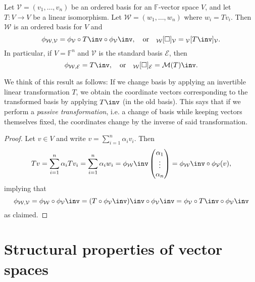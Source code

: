 \documentclass[a4paper, 11pt]{memoir}
\theoremstyle{plaincustomnumber}
\theoremstyle{changedotbreakcustomnumber}
\newcommand{\calV}{\mathcal{V}}
\newcommand{\calW}{\mathcal{W}}
\newcommand{\calE}{\mathcal{E}}
\newcommand{\field}{\mathbb{F}}
\begin{document}
\begin{proposition}
    Let $\calV = (v_1, \ldots, v_n)$ be an ordered basis for an $\field$-vector space $V$, and let $T \colon V \to V$ be a linear isomorphism. Let $\calW = (w_1, \ldots, w_n)$ where $w_i = Tv_i$. Then $\calW$ is an ordered basis for $V$ and
    \begin{equation*}
        \basischange{\calW}{\calV}
            = \coordmap{\calV} \circ T\inv \circ \coordmap{\calV}\inv,
        \quad \text{or} \quad
        \basischangemat{\calW}{\calV}
            = \mr{\calV}{T\inv}{\calV}.
    \end{equation*}
    In particular, if $V = \field^n$ and $\calV$ is the standard basis $\calE$, then
    \begin{equation*}
        \basischange{\calW}{\calE}
            = T\inv,
        \quad \text{or} \quad
        \basischangemat{\calW}{\calE}
            = \smr{T}\inv.
    \end{equation*}
\end{proposition}
%
We think of this result as follows: If we change basis by applying an invertible linear transformation $T$, we obtain the coordinate vectors corresponding to the transformed basis by applying $T\inv$ (in the old basis). This says that if we perform a \emph{passive transformation}, i.e. a change of basis while keeping vectors themselves fixed, the coordinates change by the inverse of said transformation.

\begin{proof}
    Let $v \in V$ and write $v = \sum_{i=1}^n \alpha_i v_i$. Then
    \begin{equation*}
        Tv
            = \sum_{i=1}^n \alpha_i Tv_i
            = \sum_{i=1}^n \alpha_i w_i
            = \coordmap{\calW}\inv \colvec{\alpha_1 \\ \vdots \\ \alpha_n}
            = \coordmap{\calW}\inv \circ \coordmap{\calV}(v),
    \end{equation*}
    implying that
    \begin{equation*}
        \basischange{\calW}{\calV}
            = \coordmap{\calW} \circ \coordmap{\calV}\inv
            = (T \circ \coordmap{\calV}\inv)\inv \circ \coordmap{\calV}\inv
            = \coordmap{\calV} \circ T\inv \circ \coordmap{\calV}\inv
    \end{equation*}
    as claimed.
\end{proof}


\chapter{Structural properties of vector spaces}\label{testchapter}
\end{document}
